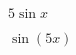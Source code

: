 \documentclass{article}
\begin{document}
\begin{multicols}{2}
    \item $5\sin x$
    \item $\sin(5x)$
\end{multicols}
\end{document}

